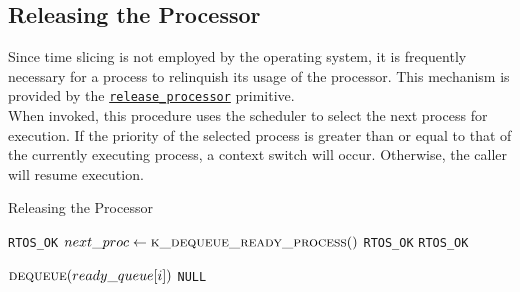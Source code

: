 \documentclass[12pt]{report}
\begin{document}
\subsection{Releasing the Processor}

Since time slicing is not employed by the operating system, it is frequently necessary for a process to relinquish its usage of the processor. This mechanism is provided by the \hyperref[alg:releasingtheprocessor]{\texttt{release_processor}} primitive.\\

When invoked, this procedure uses the scheduler to select the next process for execution. If the priority of the selected process is greater than or equal to that of the currently executing process, a context switch will occur. Otherwise, the caller will resume execution.\\

\begin{algorithm}
\caption{Releasing the Processor}
\label{alg:releasingtheprocessor}
\begin{algorithmic}[1]
        \State \Return \texttt{RTOS_OK} 
    \EndIf
    \State $next\_proc \leftarrow \Call{k\_dequeue\_ready\_process}{\null}$ 
            \State \Return \texttt{RTOS_OK} 
        \EndIf
    \EndIf
    \State {}
    \State \Return \texttt{RTOS_OK}
\EndProcedure

\Statex

     
            \State \Return $\Call{dequeue}{ready\_queue[i]}$
        \EndIf
    \EndFor
    \State \Return \texttt{NULL}
\EndProcedure
\end{algorithmic}
\end{algorithm}
\end{document}

